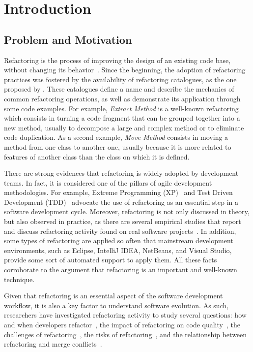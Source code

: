 \chapter{Introduction}
\label{ChIntro}


\section{Problem and Motivation}
\label{SecMotivation}

Refactoring is the process of improving the design of an existing code base, 
without changing its behavior~\citep{Opdyke:1992}.
Since the beginning, the adoption of refactoring practices was fostered by the availability of refactoring catalogues, as the one proposed by \cite{Fowler:1999}.
These catalogues define a name and describe the mechanics of common refactoring operations,
as well as demonstrate its application through some code examples.
For example, \emph{Extract Method} is a well-known refactoring which consists in turning a code fragment that can be grouped together into a new method, usually to decompose a large and complex method or to eliminate code duplication.
As a second example, \emph{Move Method} consists in moving a method from one class to another one, usually because it is more related to features of another class than the class on which it is defined.

There are strong evidences that refactoring
is widely adopted by development teams.
In fact, it is considered one of the pillars of agile development methodologies.
For example, Extreme Programming (XP)~\citep{Beck:1999} and Test Driven Development (TDD)~\citep{Beck:2003} advocate the use of refactoring as an essential step in a software development cycle.
Moreover, refactoring is not only discussed in theory, but also observed in practice, as there are several empirical studies that report and discuss refactoring activity found on real software projects~\citep{MurphyHill2012, tsantalis_empiricalstudy, Kim:2012:FSE, kim-tse-2014, negara2013}.
In addition, some types of refactoring are applied so often that mainstream development environments, such as Eclipse, IntelliJ IDEA, NetBeans, and Visual Studio, provide some sort of automated support to apply them.
All these facts corroborate to the argument that refactoring is an important and well-known technique.

Given that refactoring is an essential aspect of the software development workflow, it is also a key factor to understand software evolution.
As such, researchers have investigated refactoring activity to study several questions: how and when developers refactor~\citep{MurphyHill2012}, the impact of refactoring on code quality~\citep{Kim:2012:FSE, kim-tse-2014}, the challenges of refactoring~\citep{Kim:2012:FSE, kim-tse-2014}, the risks of refactoring~\citep{Kim:2012:FSE, kim-tse-2014, Kim:2011, Weissgerber:2006, bavota2012does, ferreira2018buggy}, and the relationship between refactoring and merge conflicts~\citep{mahmoudi2019refactorings}.


